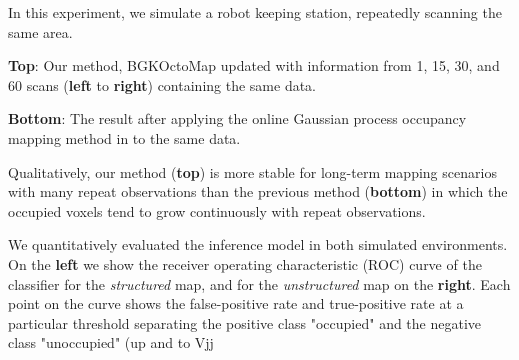 \documentclass[portrait,final,archD,fontscale=0.477]{baposter}
\begin{document}
\begin{poster}
{\begin{multicols}{2}
\columnbreak

In this experiment, we simulate a robot keeping station, repeatedly scanning the same area. 

\textbf{Top}: Our method, BGKOctoMap updated with information from 1, 15, 30, and 60 scans (\textbf{left} to \textbf{right}) containing the same data.

\textbf{Bottom}: The result after applying the online Gaussian process occupancy mapping method in \cite{jwang} to the same data.

Qualitatively, our method (\textbf{top}) is more stable for long-term mapping scenarios with many repeat observations than the previous method (\textbf{bottom}) in which the occupied voxels tend to grow continuously with repeat observations.

\end{multicols}

\setlength{\columnsep}{0.1em}
\vspace{0.1em}
\begin{multicols}{2}

We quantitatively evaluated the inference model in both simulated environments. On the \textbf{left} we show the receiver operating characteristic (ROC) curve of the classifier for the \textit{structured} map, and for the \textit{unstructured} map on the \textbf{right}. Each point on the curve shows the false-positive rate and true-positive rate at a particular threshold separating the positive class "occupied" and the negative class "unoccupied" (up and to Vjj

\end{multicols}

}


\end{poster}
\end{document}
